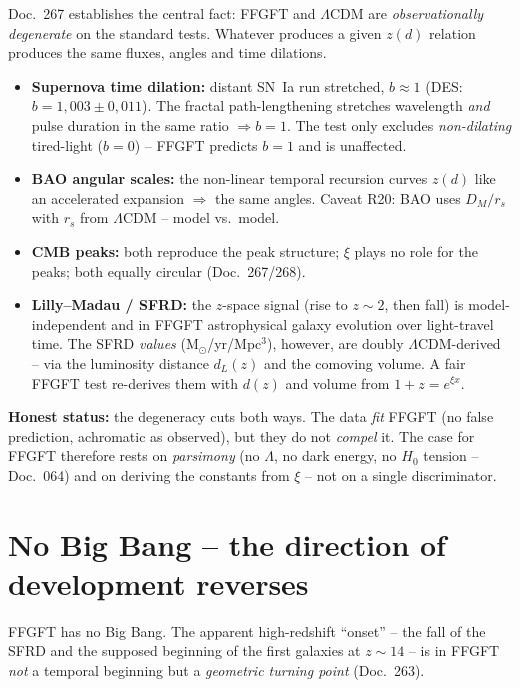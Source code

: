 Doc.~267 establishes the central fact: FFGFT and $\Lambda$CDM are
\emph{observationally degenerate} on the standard tests. Whatever produces a given
$z(d)$ relation produces the same fluxes, angles and time dilations.

\begin{itemize}
  \item \textbf{Supernova time dilation:} distant SN~Ia run stretched,
        $b\approx1$ (DES: $b=1{,}003\pm0{,}011$). The fractal path-lengthening
        stretches wavelength \emph{and} pulse duration in the same ratio
        $\Rightarrow b=1$. The test only excludes \emph{non-dilating} tired-light
        ($b=0$) -- FFGFT predicts $b=1$ and is unaffected.
  \item \textbf{BAO angular scales:} the non-linear temporal recursion curves
        $z(d)$ like an accelerated expansion $\Rightarrow$ the same angles. Caveat
        R20: BAO uses $D_M/r_s$ with $r_s$ from $\Lambda$CDM -- model vs.\ model.
  \item \textbf{CMB peaks:} both reproduce the peak structure; $\xi$ plays no role
        for the peaks; both equally circular (Doc.~267/268).
  \item \textbf{Lilly--Madau / SFRD:} the $z$-space signal (rise to $z\sim2$, then
        fall) is model-independent and in FFGFT astrophysical galaxy evolution over
        light-travel time. The SFRD \emph{values} (M$_\odot$/yr/Mpc$^3$), however,
        are doubly $\Lambda$CDM-derived -- via the luminosity distance $d_L(z)$ and
        the comoving volume. A fair FFGFT test re-derives them with $d(z)$ and volume
        from $1+z=e^{\xi x}$.
\end{itemize}

\textbf{Honest status:} the degeneracy cuts both ways. The data \emph{fit} FFGFT (no
false prediction, achromatic as observed), but they do not \emph{compel} it. The case
for FFGFT therefore rests on \emph{parsimony} (no $\Lambda$, no dark energy, no $H_0$
tension -- Doc.~064) and on deriving the constants from $\xi$ -- not on a single
discriminator.

\section{No Big Bang -- the direction of development reverses}

FFGFT has no Big Bang. The apparent high-redshift \enquote{onset} -- the fall of the
SFRD and the supposed beginning of the first galaxies at $z\sim14$ -- is in FFGFT
\emph{not} a temporal beginning but a \emph{geometric turning point} (Doc.~263).

